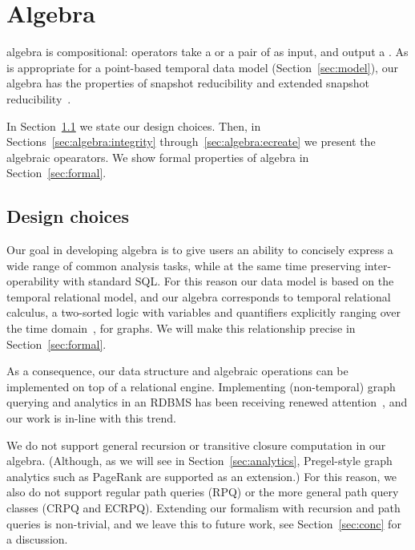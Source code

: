 \section{Algebra}
\label{sec:algebra}
\setlength{\textfloatsep}{5pt}%

\tg algebra is compositional: operators take a \tg or a pair of \tgs
as input, and output a \tg.  As is appropriate for a point-based
temporal data model (Section~\ref{sec:model}), our algebra has the
properties of snapshot reducibility and extended snapshot
reducibility~\cite{DBLP:reference/db/Bohlen092}.

In Section~\ref{sec:algebra:prelim} we state our design choices.
Then, in Sections~\ref{sec:algebra:integrity}
through~\ref{sec:algebra:ecreate} we present the algebraic opearators.
We show formal properties of \tg algebra in Section~\ref{sec:formal}.

\subsection{Design choices}
\label{sec:algebra:prelim}

Our goal in developing \tg algebra is to give users an ability to
concisely express a wide range of common analysis tasks, while at the
same time preserving inter-operability with standard SQL.  For this
reason our data model is based on the temporal relational model, and
our algebra corresponds to temporal relational calculus, a two-sorted
logic with variables and quantifiers explicitly ranging over the time
domain~\cite{DBLP:reference/db/Toman09}, for graphs.  We will make
this relationship precise in Section~\ref{sec:formal}.

As a consequence, our data structure and algebraic operations can be
implemented on top of a relational engine.  Implementing
(non-temporal) graph querying and analytics in an RDBMS has been
receiving renewed
attention~\cite{DBLP:conf/sigmod/AbergerTOR16,DBLP:conf/sigmod/SunFSKHX15,DBLP:journals/pvldb/Xirogiannopoulos15},
and our work is in-line with this trend.


We do not support general recursion or transitive closure
computation in our algebra. (Although, as we will see in
Section~\ref{sec:analytics}, Pregel-style graph analytics such as
PageRank are supported as an extension.)  For this reason, we also do
not support regular path queries (RPQ) or the more general path query
classes (CRPQ and ECRPQ).  Extending our formalism with recursion and
path queries is non-trivial, and we leave this to future work, see
Section~\ref{sec:conc} for a discussion.

